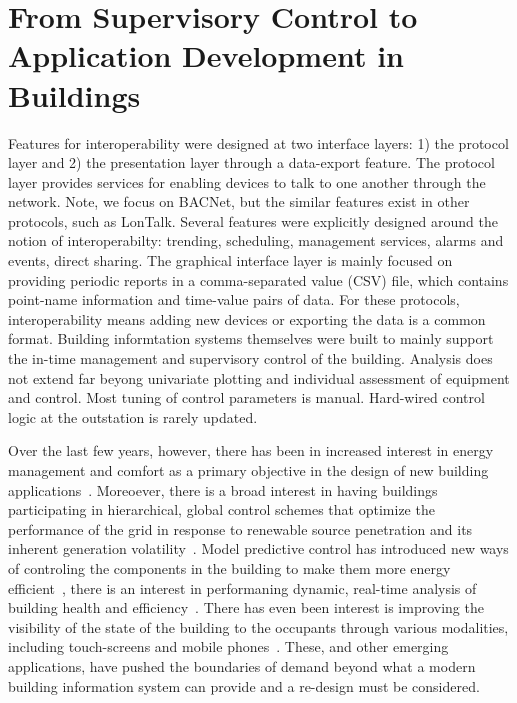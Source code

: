 \section{From Supervisory Control to Application Development in Buildings}

Features for interoperability were designed at two interface layers: 1) the protocol layer and 2) the presentation layer through a
data-export feature.  The protocol layer provides services for enabling devices to talk to one another through the network.  Note, 
we focus on BACNet, but the similar features exist in other protocols, such as LonTalk.  Several features were explicitly designed around
the notion of interoperabilty: trending, scheduling, management services, alarms and events, direct sharing.  The graphical
interface layer is mainly focused on providing periodic reports in a comma-separated value (CSV) file, which
contains point-name information and time-value pairs of data.
For these protocols, interoperability means adding new devices or exporting the data is a common format.
Building informtation systems themselves
were built to mainly support the in-time management and supervisory control of the building.  Analysis does not 
extend far beyong univariate plotting and individual assessment of equipment and control.  Most tuning of control parameters is 
manual.  Hard-wired control logic at the outstation is rarely updated.


Over the last few years, however, there has been in increased interest in energy management and comfort as a primary objective 
in the design of new building applications~\cite{6146507,Yu1956572,Mamidi2343582}.  Moreoever, there is a broad interest in having buildings 
participating in hierarchical, 
global control schemes that optimize the performance of the grid in response to renewable source penetration and its inherent 
generation volatility~\cite{Taneja2223873,5985456,Lu2009}.  Model predictive control has introduced new ways of controling the components in the building
to make them more energy efficient~\cite{mpc}, there is an interest in performaning dynamic, real-time analysis of building health
and efficiency~\cite{dynamicLeed}.  There has even been interest is improving the visibility of the state of the building to the 
occupants through various modalities, including touch-screens and mobile phones~\cite{andrew_lighting, Hsu1878444, Ortiz2422540}.  
These, and other emerging applications,
have pushed the boundaries of demand beyond what a modern building information system can provide and a re-design must be considered.
